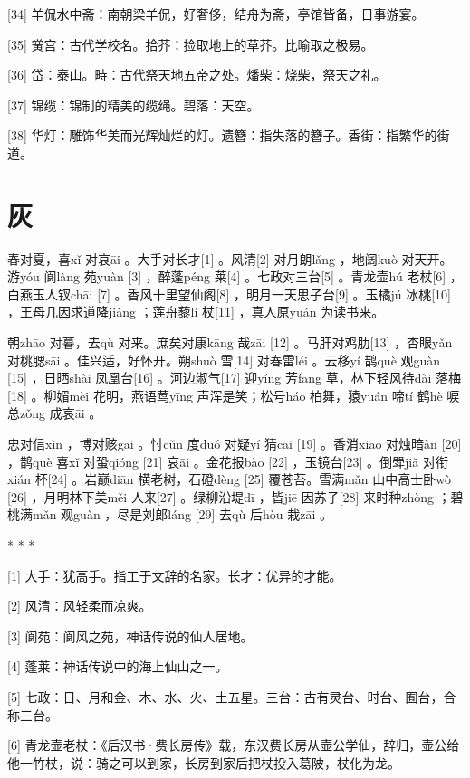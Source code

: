 \documentclass[12pt,UTF8]{ctexbook}
\begin{document}
[34] 羊侃水中斋：南朝梁羊侃，好奢侈，结舟为斋，亭馆皆备，日事游宴。

[35] 黉宫：古代学校名。拾芥：捡取地上的草芥。比喻取之极易。

[36] 岱：泰山。畤：古代祭天地五帝之处。燔柴：烧柴，祭天之礼。

[37] 锦缆：锦制的精美的缆绳。碧落：天空。

[38] 华灯：雕饰华美而光辉灿烂的灯。遗簪：指失落的簪子。香街：指繁华的街道。





\chapter{灰}


春对夏，喜xǐ 对哀āi 。大手对长才[1] 。风清[2] 对月朗lǎng ，地阔kuò 对天开。游yóu 阆làng 苑yuàn [3] ，醉蓬péng 莱[4] 。七政对三台[5] 。青龙壶hú 老杖[6] ，白燕玉人钗chāi [7] 。香风十里望仙阁[8] ，明月一天思子台[9] 。玉橘jú 冰桃[10] ，王母几因求道降jiàng ；莲舟藜lí 杖[11] ，真人原yuán 为读书来。

朝zhāo 对暮，去qù 对来。庶矣对康kāng 哉zāi [12] 。马肝对鸡肋[13] ，杏眼yǎn 对桃腮sāi 。佳兴适，好怀开。朔shuò 雪[14] 对春雷léi 。云移yí 鹊què 观guàn [15] ，日晒shài 凤凰台[16] 。河边淑气[17] 迎yíng 芳fāng 草，林下轻风待dài 落梅[18] 。柳媚mèi 花明，燕语莺yīng 声浑是笑；松号háo 柏舞，猿yuán 啼tí 鹤hè 唳总zǒng 成哀āi 。

忠对信xìn ，博对赅gāi 。忖cǔn 度duó 对疑yí 猜cāi [19] 。香消xiāo 对烛暗àn [20] ，鹊què 喜xǐ 对蛩qióng [21] 哀āi 。金花报bào [22] ，玉镜台[23] 。倒斝jiǎ 对衔xián 杯[24] 。岩巅diān 横老树，石磴dèng [25] 覆苍苔。雪满mǎn 山中高士卧wò [26] ，月明林下美měi 人来[27] 。绿柳沿堤dī ，皆jiē 因苏子[28] 来时种zhòng ；碧桃满mǎn 观guàn ，尽是刘郎láng [29] 去qù 后hòu 栽zāi 。



* * *



[1] 大手：犹高手。指工于文辞的名家。长才：优异的才能。

[2] 风清：风轻柔而凉爽。

[3] 阆苑：阆风之苑，神话传说的仙人居地。

[4] 蓬莱：神话传说中的海上仙山之一。

[5] 七政：日、月和金、木、水、火、土五星。三台：古有灵台、时台、囿台，合称三台。

[6] 青龙壶老杖：《后汉书·费长房传》载，东汉费长房从壶公学仙，辞归，壶公给他一竹杖，说：骑之可以到家，长房到家后把杖投入葛陂，杖化为龙。
\end{document}
